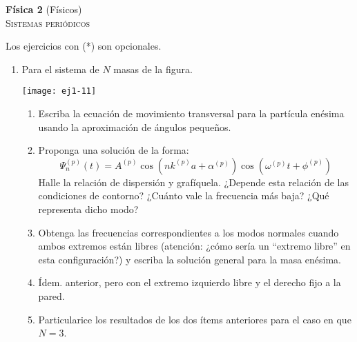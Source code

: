 \documentclass[11pt,spanish,a4paper]{article}
\begin{document}
\begin{center}
\textbf{Física 2} (Físicos) \hfill {}\\
	\textsc{\LARGE Sistemas periódicos}
\end{center}

Los ejercicios con (*) son opcionales.

\begin{enumerate}



\subsection*{Modos normales en sistemas periódicos}


\item
\begin{minipage}[t][1cm]{0.45\textwidth}
Para el sistema de $N$ masas de la figura. 
\end{minipage}
\begin{minipage}[c][1.5cm][t]{0.5\textwidth}
  \texttt{[image: ej1-11]}
\end{minipage}
\begin{enumerate}
	\item Escriba la ecuación de movimiento transversal para la partícula enésima usando la aproximación de ángulos pequeños.
	\item Proponga una solución de la forma:
	\[
		\Psi_{n}^{(p)}(t)=A^{(p)}\cos\left(nk^{(p)}a+\alpha^{(p)}\right)\cos\left(\omega^{(p)}t+\phi^{(p)}\right)
	\]
	Halle la relación de dispersión y grafíquela.
	¿Depende esta relación de las condiciones de contorno?
	¿Cuánto vale la frecuencia más baja?
	¿Qué representa dicho modo? 
	\item Obtenga las frecuencias correspondientes a los modos normales cuando ambos extremos están libres (atención: ¿cómo sería un ``extremo libre'' en esta configuración?) y escriba la solución general para la masa enésima. 
	\item Ídem. anterior, pero con el extremo izquierdo libre y el derecho fijo a la pared. 
	\item Particularice los resultados de los dos ítems anteriores para el caso en que $N=3$.
\end{enumerate}




\end{enumerate}
\end{document}
